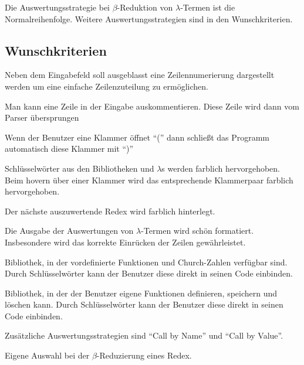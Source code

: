 \documentclass[parskip=full,11pt,twoside]{scrartcl}
\begin{document}
Die Auswertungsstrategie bei $\beta$-Reduktion von $\lambda$-Termen ist die Normalreihenfolge. Weitere Auswertungsstrategien sind in den Wunschkriterien.


\newpage
\subsection{Wunschkriterien}

Neben dem Eingabefeld soll ausgeblasst eine Zeilennumerierung dargestellt werden um eine einfache Zeilenzuteilung zu ermöglichen.

Man kann eine Zeile in der Eingabe auskommentieren. Diese Zeile wird dann vom Parser übersprungen

Wenn der Benutzer eine Klammer öffnet \enquote{(} dann schließt das Programm automatisch diese Klammer mit \enquote{)}

Schlüsselwörter aus den Bibliotheken und $\lambda$s werden farblich hervorgehoben. Beim hovern über einer Klammer wird das entsprechende Klammerpaar farblich hervorgehoben.

Der nächste auszuwertende Redex wird farblich hinterlegt.

Die Ausgabe der Auswertungen von $\lambda$-Termen wird schön formatiert. Insbesondere wird das korrekte Einrücken der Zeilen gewährleistet.

Bibliothek, in der vordefinierte Funktionen und Church-Zahlen verfügbar sind. Durch Schlüsselwörter kann der Benutzer diese direkt in seinen Code einbinden.

Bibliothek, in der der Benutzer eigene Funktionen definieren, speichern und löschen kann. Durch Schlüsselwörter kann der Benutzer diese direkt in seinen Code einbinden.

Zusätzliche Auswertungsstrategien sind \enquote{Call by Name} und \enquote{Call by Value}.

Eigene Auswahl bei der $\beta$-Reduzierung eines Redex.
\end{document}
